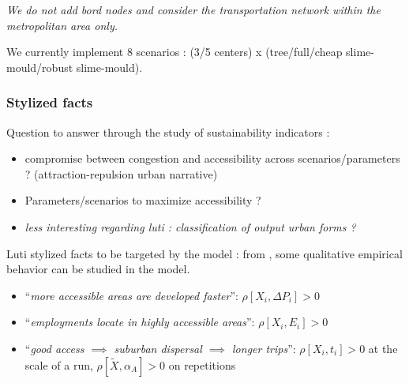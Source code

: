 \textit{We do not add bord nodes and consider the transportation network within the metropolitan area only.}

We currently implement 8 scenarios : (3/5 centers) x (tree/full/cheap slime-mould/robust slime-mould).


\subsubsection{Stylized facts}

Question to answer through the study of sustainability indicators :
\begin{itemize}
  \item compromise between congestion and accessibility across scenarios/parameters ? (attraction-repulsion urban narrative)
  \item Parameters/scenarios to maximize accessibility ?
  \item \textit{less interesting regarding luti : classification of output urban forms ?}
\end{itemize}


Luti stylized facts to be targeted by the model : from \cite{wegener2004land}, some qualitative empirical behavior can be studied in the model.


\begin{itemize}
	\item ``\textit{more accessible areas are developed faster}'': $\rho\left[X_i,\Delta P_i\right] > 0$
	\item ``\textit{employments locate in highly accessible areas}'': $\rho\left[X_i,E_i\right] > 0$
	\item ``\textit{good access $\implies$ suburban dispersal $\implies$ longer trips}'': $\rho\left[X_i,t_i\right] > 0$ at the scale of a run, $\rho\left[\tilde{X},\alpha_A\right] > 0$ on repetitions
\end{itemize}




